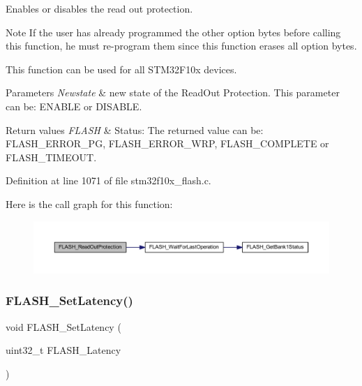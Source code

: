 Enables or disables the read out protection. 

\begin{DoxyNote}{Note}
If the user has already programmed the other option bytes before calling this function, he must re-\/program them since this function erases all option bytes. 

This function can be used for all S\+T\+M32\+F10x devices. 
\end{DoxyNote}

\begin{DoxyParams}{Parameters}
{\em Newstate} & new state of the Read\+Out Protection. This parameter can be\+: E\+N\+A\+B\+LE or D\+I\+S\+A\+B\+LE. \\
\hline
\end{DoxyParams}

\begin{DoxyRetVals}{Return values}
{\em F\+L\+A\+SH} & Status\+: The returned value can be\+: F\+L\+A\+S\+H\+\_\+\+E\+R\+R\+O\+R\+\_\+\+PG, F\+L\+A\+S\+H\+\_\+\+E\+R\+R\+O\+R\+\_\+\+W\+RP, F\+L\+A\+S\+H\+\_\+\+C\+O\+M\+P\+L\+E\+TE or F\+L\+A\+S\+H\+\_\+\+T\+I\+M\+E\+O\+UT. \\
\hline
\end{DoxyRetVals}


Definition at line 1071 of file stm32f10x\+\_\+flash.\+c.

Here is the call graph for this function\+:
\nopagebreak
\begin{figure}[H]
\begin{center}
\leavevmode
\includegraphics[width=350pt]{group___f_l_a_s_h___private___functions_ga0b8d1a8277950c890bbc247bbeafb40f_cgraph}
\end{center}
\end{figure}
\mbox{\label{group___f_l_a_s_h___private___functions_ga54bcb96270215c752c3479c8c9e438c0}} 
\subsubsection{\texorpdfstring{F\+L\+A\+S\+H\+\_\+\+Set\+Latency()}{FLASH\_SetLatency()}}
{\footnotesize\ttfamily void F\+L\+A\+S\+H\+\_\+\+Set\+Latency (\begin{DoxyParamCaption}\item[{uint32\+\_\+t}]{F\+L\+A\+S\+H\+\_\+\+Latency }\end{DoxyParamCaption})}



